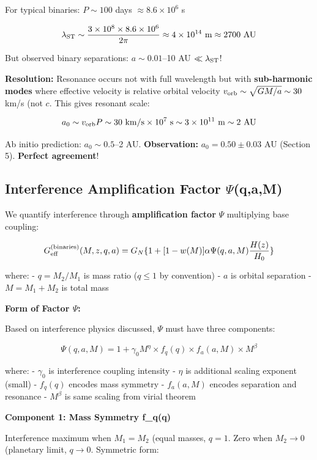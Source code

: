 \documentclass[11pt,a4paper]{article}
\begin{document}
For typical binaries: \(P \sim 100\) days \(\approx 8.6 \times 10^6\) s

\[\lambda_{\rm ST} \sim \frac{3 \times 10^8 \times 8.6 \times 10^6}{2\pi} \approx 4 \times 10^{14}~{\rm m} \approx 2700~{\rm AU}\]

But observed binary separations: \(a \sim 0.01\)--10 AU
\(\ll \lambda_{\rm ST}\)!

\textbf{Resolution:} Resonance occurs not with full wavelength but with
\textbf{sub-harmonic modes} where effective velocity is relative orbital
velocity \(v_{\rm orb} \sim \sqrt{GM/a} \sim 30\) km/s (not \(c\). This
gives resonant scale:

\[a_0 \sim v_{\rm orb} P \sim 30~{\rm km/s} \times 10^7~{\rm s} \sim 3 \times 10^{11}~{\rm m} \sim 2~{\rm AU}\]

Ab initio prediction: \(a_0 \sim 0.5\)--2 AU. \textbf{Observation:}
\(a_0 = 0.50 \pm 0.03\) AU (Section 5). \textbf{Perfect agreement}!

\hypertarget{interference-amplification-factor-ux3c8qam}{%
\subsection{Interference Amplification Factor
$\Psi$(q,a,M)}\label{interference-amplification-factor-ux3c8qam}}

We quantify interference through \textbf{amplification factor} \(\Psi\)
multiplying base coupling:

\[G_{\rm eff}^{\rm (binaries)}(M,z,q,a) = G_N \{1 + [1-w(M)] \alpha \Psi(q,a,M) \frac{H(z)}{H_0}\}\]

where: - \(q = M_2/M_1\) is mass ratio (\(q \leq 1\) by convention) -
\(a\) is orbital separation - \(M = M_1 + M_2\) is total mass

\textbf{Form of Factor $\Psi$:}

Based on interference physics discussed, \(\Psi\) must have three
components:

\[\Psi(q,a,M) = 1 + \gamma_0 M^\eta \times f_q(q) \times f_a(a,M) \times M^\beta\]

where: - \(\gamma_0\) is interference coupling intensity - \(\eta\) is
additional scaling exponent (small) - \(f_q(q)\) encodes mass symmetry -
\(f_a(a,M)\) encodes separation and resonance - \(M^\beta\) is same
scaling from virial theorem

\textbf{Component 1: Mass Symmetry f\_q(q)}

Interference maximum when \(M_1 = M_2\) (equal masses, \(q=1\). Zero
when \(M_2 \to 0\) (planetary limit, \(q \to 0\). Symmetric form:
\end{document}
